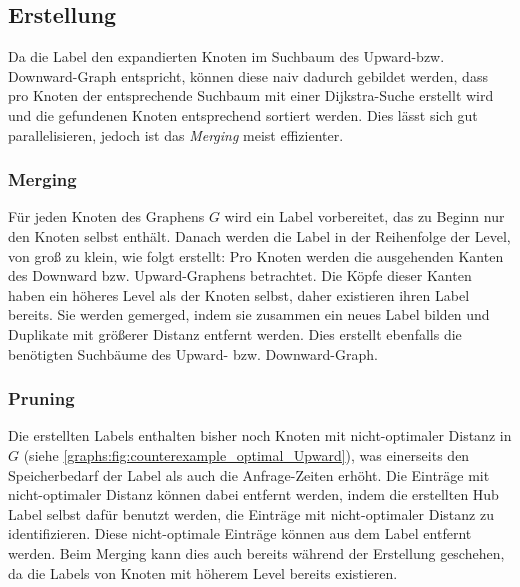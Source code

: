\subsection{Erstellung}

Da die Label den expandierten Knoten im Suchbaum des Upward-bzw. Downward-Graph entspricht, können diese naiv dadurch gebildet werden, dass pro Knoten der entsprechende Suchbaum mit einer Dijkstra-Suche erstellt wird und die gefundenen Knoten entsprechend sortiert werden.
Dies lässt sich gut parallelisieren, jedoch ist das \emph{Merging} meist effizienter.

\subsubsection{Merging}

Für jeden Knoten des Graphens $G$ wird ein Label vorbereitet, das zu Beginn nur den Knoten selbst enthält.
Danach werden die Label in der Reihenfolge der Level, von groß zu klein, wie folgt erstellt:
Pro Knoten werden die ausgehenden Kanten des Downward bzw. Upward-Graphens betrachtet.
Die Köpfe dieser Kanten haben ein höheres Level als der Knoten selbst, daher existieren ihren Label bereits.
Sie werden gemerged, indem sie zusammen ein neues Label bilden und Duplikate mit größerer Distanz entfernt werden.
Dies erstellt ebenfalls die benötigten Suchbäume des Upward- bzw. Downward-Graph.


\subsubsection{Pruning}

Die erstellten Labels enthalten bisher noch Knoten mit nicht-optimaler Distanz in $G$ (siehe \autoref{graphs:fig:counterexample_optimal_Upward}), was einerseits den Speicherbedarf der  Label als auch die Anfrage-Zeiten erhöht.
Die Einträge mit nicht-optimaler Distanz können dabei entfernt werden, indem die erstellten Hub Label selbst dafür benutzt werden, die Einträge mit nicht-optimaler Distanz zu identifizieren.
Diese nicht-optimale Einträge können aus dem Label entfernt werden.
Beim Merging kann dies auch bereits während der Erstellung geschehen, da die Labels von Knoten mit höherem Level bereits existieren.
